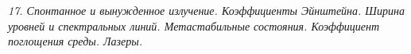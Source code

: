 \emph{17. Спонтанное и вынужденное излучение. Коэффициенты Эйнштейна. 
Ширина уровней и спектральных линий. Метастабильные состояния. 
Коэффициент поглощения среды. Лазеры.}

\newpage
